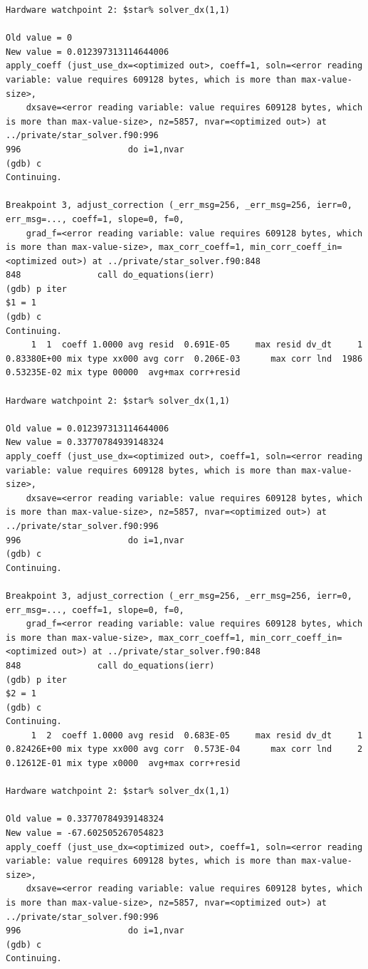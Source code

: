 \documentclass[a4paper,10pt]{article}
\begin{document}
\begin{verbatim}
Hardware watchpoint 2: $star% solver_dx(1,1)

Old value = 0
New value = 0.012397313114644006
apply_coeff (just_use_dx=<optimized out>, coeff=1, soln=<error reading variable: value requires 609128 bytes, which is more than max-value-size>, 
    dxsave=<error reading variable: value requires 609128 bytes, which is more than max-value-size>, nz=5857, nvar=<optimized out>) at ../private/star_solver.f90:996
996	                    do i=1,nvar
(gdb) c
Continuing.

Breakpoint 3, adjust_correction (_err_msg=256, _err_msg=256, ierr=0, err_msg=..., coeff=1, slope=0, f=0, 
    grad_f=<error reading variable: value requires 609128 bytes, which is more than max-value-size>, max_corr_coeff=1, min_corr_coeff_in=<optimized out>) at ../private/star_solver.f90:848
848	              call do_equations(ierr)               
(gdb) p iter
$1 = 1
(gdb) c
Continuing.
     1  1  coeff 1.0000 avg resid  0.691E-05     max resid dv_dt     1  0.83380E+00 mix type xx000 avg corr  0.206E-03      max corr lnd  1986  0.53235E-02 mix type 00000  avg+max corr+resid

Hardware watchpoint 2: $star% solver_dx(1,1)

Old value = 0.012397313114644006
New value = 0.33770784939148324
apply_coeff (just_use_dx=<optimized out>, coeff=1, soln=<error reading variable: value requires 609128 bytes, which is more than max-value-size>, 
    dxsave=<error reading variable: value requires 609128 bytes, which is more than max-value-size>, nz=5857, nvar=<optimized out>) at ../private/star_solver.f90:996
996	                    do i=1,nvar
(gdb) c
Continuing.

Breakpoint 3, adjust_correction (_err_msg=256, _err_msg=256, ierr=0, err_msg=..., coeff=1, slope=0, f=0, 
    grad_f=<error reading variable: value requires 609128 bytes, which is more than max-value-size>, max_corr_coeff=1, min_corr_coeff_in=<optimized out>) at ../private/star_solver.f90:848
848	              call do_equations(ierr)               
(gdb) p iter
$2 = 1
(gdb) c
Continuing.
     1  2  coeff 1.0000 avg resid  0.683E-05     max resid dv_dt     1  0.82426E+00 mix type xx000 avg corr  0.573E-04      max corr lnd     2  0.12612E-01 mix type x0000  avg+max corr+resid

Hardware watchpoint 2: $star% solver_dx(1,1)

Old value = 0.33770784939148324
New value = -67.602505267054823
apply_coeff (just_use_dx=<optimized out>, coeff=1, soln=<error reading variable: value requires 609128 bytes, which is more than max-value-size>, 
    dxsave=<error reading variable: value requires 609128 bytes, which is more than max-value-size>, nz=5857, nvar=<optimized out>) at ../private/star_solver.f90:996
996	                    do i=1,nvar
(gdb) c
Continuing.


\end{verbatim}
\end{document}
